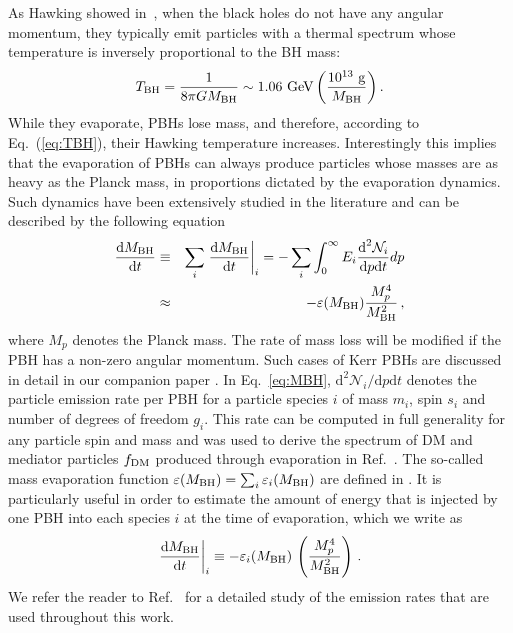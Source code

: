 \documentclass[aps,prd,reprint,twocolumn,preprintnumbers,floatfix,nofootinbib]{revtex4-1}
\newcommand{\bea}{\begin{eqnarray}}
\newcommand{\eea}{\end{eqnarray}}
\newcommand{\lucien}[1]{\textcolor{cyan}{\textbf{[LH: #1]}}}
\newcommand{\dd}{\text{d}}
\newcommand{\MBH}{M_{\rm BH}}
\newcommand{\equaref}[1]{Eq.~(\ref{#1})}
\begin{document}
As Hawking showed in~\cite{Hawking:1974rv,Hawking:1974sw}, when the black holes do not have any angular momentum, they typically emit particles with a thermal spectrum whose temperature is inversely proportional to the BH mass:
\begin{align}\label{eq:TBH}
 T_{\rm BH} = \frac{1}{8\pi G M_{\rm BH}}\sim 1.06~{\rm GeV}\left(\frac{10^{13}~{\rm g}}{M_{\rm BH}}\right).
\end{align}
While they evaporate, PBHs lose mass, and therefore, according to \equaref{eq:TBH}, their Hawking temperature increases. Interestingly this implies that the evaporation of PBHs can always produce particles whose masses are as heavy as the Planck mass, in proportions dictated by the evaporation dynamics.
Such dynamics have been extensively studied in the literature and can be described by the following equation~\cite{PhysRevD.41.3052,PhysRevD.44.376}
\bea\label{eq:MBH}
\frac{\dd \MBH}{\dd t}&\equiv &\sum_i \left.\frac{
\dd \MBH}{\dd t}\right|_i = -\sum_i \int_0^\infty E_i \frac{\dd^2 \mathcal{N}_{i}}{\dd p\dd t} dp\nonumber\\ 
&\approx&-\varepsilon (\MBH)\frac{M_p^4}{\MBH^2}\,,
\eea
where $M_p$ denotes the Planck mass. The rate of mass loss will be modified if the PBH has a non-zero angular momentum. Such cases of Kerr PBHs are discussed in detail in our companion paper \cite{paper1}. 
In Eq.~\ref{eq:MBH}, $\dd^2 \mathcal{N}_{i}/\dd p\dd t$ denotes the particle emission rate per PBH for a particle species $i$ of mass $m_i$, spin $s_i$ and number of degrees of freedom $g_i$. This rate can be computed in full generality for any particle spin and mass and was used to derive the spectrum of DM and mediator particles $f_{\rm DM}$ produced through evaporation in Ref.~\cite{paper1}. The so-called mass evaporation function $\varepsilon(\MBH)=\sum_i\varepsilon_i(\MBH)$ are defined in \cite{PhysRevD.44.376,Lunardini:2019zob}. It is particularly useful in order to estimate the amount of energy that is injected by one PBH into each species $i$ at the time of evaporation, which we write as
\bea
\left.\frac{\dd \MBH}{\dd t}\right|_{i}\equiv -\varepsilon_{i} (\MBH)\, \left(\frac{M_p^4}{\MBH^2}\right)\,.
\eea
We refer the reader to Ref.~\cite{paper1} for a detailed study of the emission rates that are used throughout this work.
\end{document}
